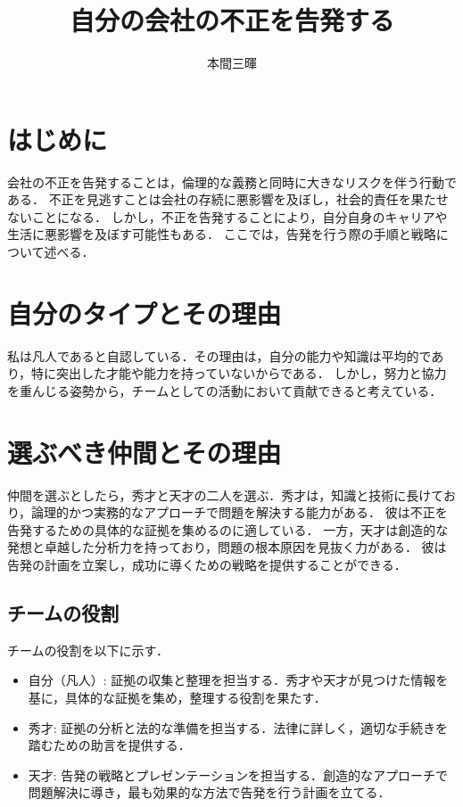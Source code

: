 \documentclass[titlepage,a4paper]{jsarticle}
\title{自分の会社の不正を告発する}
\author{本間三暉}
\begin{document}
\maketitle
\section{はじめに}
会社の不正を告発することは，倫理的な義務と同時に大きなリスクを伴う行動である．
不正を見逃すことは会社の存続に悪影響を及ぼし，社会的責任を果たせないことになる．
しかし，不正を告発することにより，自分自身のキャリアや生活に悪影響を及ぼす可能性もある．
ここでは，告発を行う際の手順と戦略について述べる．
\section{自分のタイプとその理由}
私は凡人であると自認している．その理由は，自分の能力や知識は平均的であり，特に突出した才能や能力を持っていないからである．
しかし，努力と協力を重んじる姿勢から，チームとしての活動において貢献できると考えている．
\section{選ぶべき仲間とその理由}
仲間を選ぶとしたら，秀才と天才の二人を選ぶ．秀才は，知識と技術に長けており，論理的かつ実務的なアプローチで問題を解決する能力がある．
彼は不正を告発するための具体的な証拠を集めるのに適している．
一方，天才は創造的な発想と卓越した分析力を持っており，問題の根本原因を見抜く力がある．
彼は告発の計画を立案し，成功に導くための戦略を提供することができる．
\subsection{チームの役割}
チームの役割を以下に示す．
\begin{itemize}
  \item 自分（凡人）: 証拠の収集と整理を担当する．秀才や天才が見つけた情報を基に，具体的な証拠を集め，整理する役割を果たす．
  \item 秀才: 証拠の分析と法的な準備を担当する．法律に詳しく，適切な手続きを踏むための助言を提供する．
  \item 天才: 告発の戦略とプレゼンテーションを担当する．創造的なアプローチで問題解決に導き，最も効果的な方法で告発を行う計画を立てる．
\end{itemize}
\end{document}
